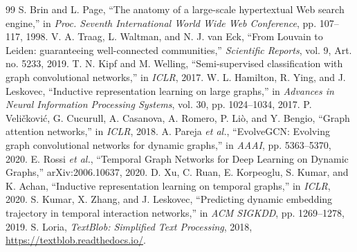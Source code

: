 \documentclass[11pt,a4paper]{article}
\begin{document}
\begin{thebibliography}{99}
 S. Brin and L. Page, ``The anatomy of a large-scale hypertextual Web search engine,'' in \emph{Proc. Seventh International World Wide Web Conference}, pp. 107--117, 1998.
 V. A. Traag, L. Waltman, and N. J. van Eck, ``From Louvain to Leiden: guaranteeing well-connected communities,'' \emph{Scientific Reports}, vol. 9, Art. no. 5233, 2019.
 T. N. Kipf and M. Welling, ``Semi-supervised classification with graph convolutional networks,'' in \emph{ICLR}, 2017.
 W. L. Hamilton, R. Ying, and J. Leskovec, ``Inductive representation learning on large graphs,'' in \emph{Advances in Neural Information Processing Systems}, vol. 30, pp. 1024--1034, 2017.
 P. Veli\v{c}kovi\'c, G. Cucurull, A. Casanova, A. Romero, P. Li\`o, and Y. Bengio, ``Graph attention networks,'' in \emph{ICLR}, 2018.
 A. Pareja \emph{et al.}, ``EvolveGCN: Evolving graph convolutional networks for dynamic graphs,'' in \emph{AAAI}, pp. 5363--5370, 2020.
 E. Rossi \emph{et al.}, ``Temporal Graph Networks for Deep Learning on Dynamic Graphs,'' arXiv:2006.10637, 2020.
 D. Xu, C. Ruan, E. Korpeoglu, S. Kumar, and K. Achan, ``Inductive representation learning on temporal graphs,'' in \emph{ICLR}, 2020.
 S. Kumar, X. Zhang, and J. Leskovec, ``Predicting dynamic embedding trajectory in temporal interaction networks,'' in \emph{ACM SIGKDD}, pp. 1269--1278, 2019.
 S. Loria, \emph{TextBlob: Simplified Text Processing}, 2018, \url{https://textblob.readthedocs.io/}.
\end{thebibliography}
\end{document}
